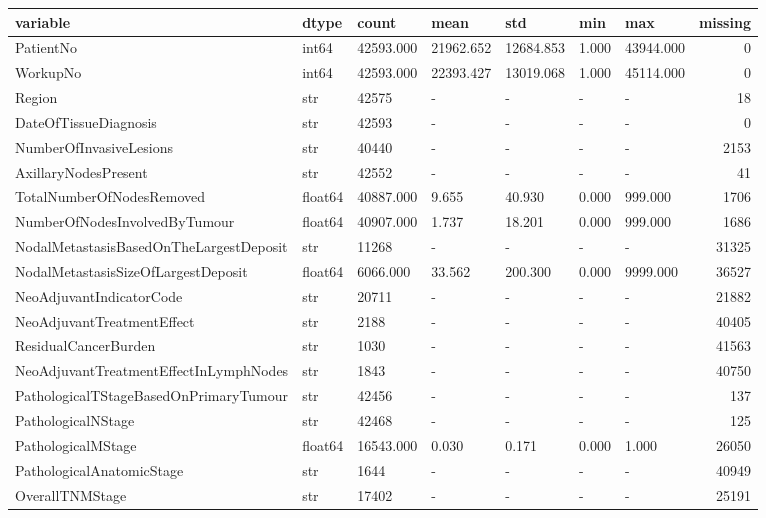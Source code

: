 \begin{tabular}{lllllllr}
\toprule
variable & dtype & count & mean & std & min & max & missing \\
\midrule
PatientNo & int64 & 42593.000 & 21962.652 & 12684.853 & 1.000 & 43944.000 & 0 \\
WorkupNo & int64 & 42593.000 & 22393.427 & 13019.068 & 1.000 & 45114.000 & 0 \\
Region & str & 42575 & - & - & - & - & 18 \\
DateOfTissueDiagnosis & str & 42593 & - & - & - & - & 0 \\
NumberOfInvasiveLesions & str & 40440 & - & - & - & - & 2153 \\
AxillaryNodesPresent & str & 42552 & - & - & - & - & 41 \\
TotalNumberOfNodesRemoved & float64 & 40887.000 & 9.655 & 40.930 & 0.000 & 999.000 & 1706 \\
NumberOfNodesInvolvedByTumour & float64 & 40907.000 & 1.737 & 18.201 & 0.000 & 999.000 & 1686 \\
NodalMetastasisBasedOnTheLargestDeposit & str & 11268 & - & - & - & - & 31325 \\
NodalMetastasisSizeOfLargestDeposit & float64 & 6066.000 & 33.562 & 200.300 & 0.000 & 9999.000 & 36527 \\
NeoAdjuvantIndicatorCode & str & 20711 & - & - & - & - & 21882 \\
NeoAdjuvantTreatmentEffect & str & 2188 & - & - & - & - & 40405 \\
ResidualCancerBurden & str & 1030 & - & - & - & - & 41563 \\
NeoAdjuvantTreatmentEffectInLymphNodes & str & 1843 & - & - & - & - & 40750 \\
PathologicalTStageBasedOnPrimaryTumour & str & 42456 & - & - & - & - & 137 \\
PathologicalNStage & str & 42468 & - & - & - & - & 125 \\
PathologicalMStage & float64 & 16543.000 & 0.030 & 0.171 & 0.000 & 1.000 & 26050 \\
PathologicalAnatomicStage & str & 1644 & - & - & - & - & 40949 \\
OverallTNMStage & str & 17402 & - & - & - & - & 25191 \\
\bottomrule
\end{tabular}
